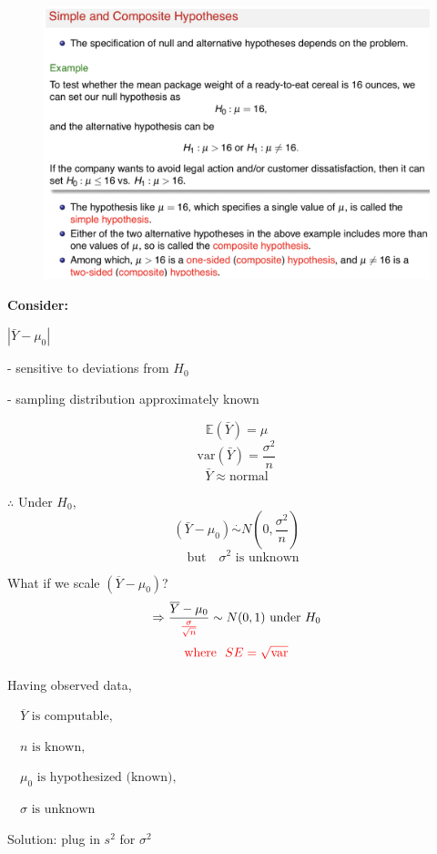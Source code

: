 \documentclass[14pt]{extarticle}
\begin{document}
\begin{figure}[h]
    \centering
    \includegraphics[width=1\textwidth]{fig3.png}
\end{figure}

\vspace{1cm}

\textbf{Consider: } 

$\left| \bar{Y} - \mu_0 \right|$ 

- sensitive to deviations from $H_0$ 

- sampling distribution approximately known

\[
\mathbb{E}(\bar{Y}) = \mu
\]
\[
\text{var}(\bar{Y}) = \frac{\sigma^2}{n}
\]
\[
\bar{Y} \approx \text{normal}
\]

$\therefore$ Under $H_0$,
\[
\left( \bar{Y} - \mu_0 \right) \overset{\cdot}{\sim} N \left( 0, \frac{\sigma^2}{n} \right)
\]
\[\quad \text{but} \quad \sigma^2 \text{ is unknown}\]

What if we scale $\left( \overline{Y} - \mu_0 \right)$?
\[
\Rightarrow \frac{\overline{Y} - \mu_0}{\textcolor{red}{\frac{\sigma}{\sqrt{n}}}} \sim N(0,1) \ \text{under} \ H_0
\]
\[
\textcolor{red}{\text{where} \ \ SE = \sqrt{\text{var}} }
\]

Having observed data,

$\quad \overline{Y} \text{ is computable}, $

$\quad n \text{ is known}, $

$\quad \mu_0 \text{ is hypothesized (known)}, $

$\quad \sigma \text{ is unknown} $

Solution: plug in $s^2$ for $\sigma^2$
\end{document}
